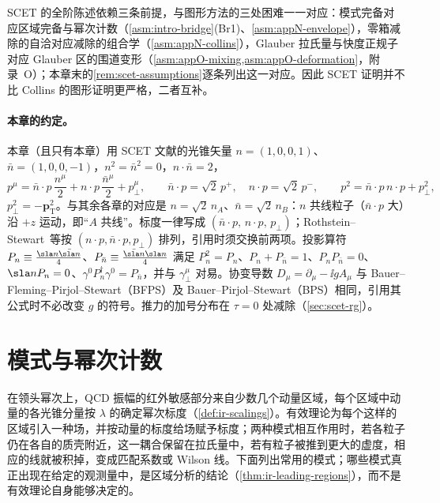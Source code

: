 SCET 的全阶陈述依赖三条前提，与图形方法的三处困难一一对应：模式完备对应区域完备与幂次计数（\cref{asm:intro-bridge}(Br1)、\cref{asm:appN-envelope}），零箱减除的自洽对应减除的组合学（\cref{asm:appN-collins}），Glauber 拉氏量与快度正规子对应 Glauber 区的围道变形（\cref{asm:appO-mixing,asm:appO-deformation}，附录~O）；本章末的\cref{rem:scet-assumptions}逐条列出这一对应。因此 SCET 证明并不比 Collins 的图形证明更严格，二者互补。

\paragraph{本章的约定。}
本章（且只有本章）用 SCET 文献的光锥矢量 $n=(1,0,0,1)$、$\bar n=(1,0,0,-1)$，$n^2=\bar n^2=0$，$n\cdot\bar n=2$，
\begin{equation}\label{eq:scet-decomp}
p^\mu=\bar n\cdot p\,\frac{n^\mu}{2}+n\cdot p\,\frac{\bar n^\mu}{2}+p_\perp^\mu,\qquad
\bar n\cdot p=\sqrt2\,p^+,\quad n\cdot p=\sqrt2\,p^-,\qquad p^2=\bar n\cdot p\,n\cdot p+p_\perp^2 ,
\end{equation}
$p_\perp^2=-\bm p_{\mathrm T}^2$。与其余各章的对应是 $n=\sqrt2\,n_A$、$\bar n=\sqrt2\,n_B$：$n$ 共线粒子（$\bar n\cdot p$ 大）沿 $+z$ 运动，即“$A$ 共线”。标度一律写成 $(\bar n\cdot p,\,n\cdot p,\,p_\perp)$；Rothstein--Stewart~\cite{RothsteinStewart2016}等按 $(n\cdot p,\bar n\cdot p,p_\perp)$ 排列，引用时须交换前两项。投影算符 $P_n\equiv\frac{\sla n\bar{\sla n}}{4}$、$P_{\bar n}\equiv\frac{\bar{\sla n}\sla n}{4}$ 满足 $P_n^2=P_n$、$P_n+P_{\bar n}=1$、$P_nP_{\bar n}=0$、$\sla nP_n=0$、$\gamma^0P_n^\dagger\gamma^0=P_{\bar n}$，并与 $\gamma_\perp^\mu$ 对易。协变导数 $D_\mu=\partial_\mu-\ii gA_\mu$ 与 Bauer--Fleming--Pirjol--Stewart（BFPS）\cite{BauerEtAl2001}及 Bauer--Pirjol--Stewart（BPS）\cite{BauerPirjolStewart2002}相同，引用其公式时不必改变 $g$ 的符号。推力的加号分布在 $\tau=0$ 处减除（\cref{sec:scet-rg}）。

\section{模式与幂次计数}\label{sec:scet-modes}

在领头幂次上，QCD 振幅的红外敏感部分来自少数几个动量区域，每个区域中动量的各光锥分量按 $\lambda$ 的确定幂次标度（\cref{def:ir-scalings}）。有效理论为每个这样的区域引入一种场，并按动量的标度给场赋予标度；两种模式相互作用时，若各粒子仍在各自的质壳附近，这一耦合保留在拉氏量中，若有粒子被推到更大的虚度，相应的线就被积掉，变成匹配系数或 Wilson 线。下面列出常用的模式；哪些模式真正出现在给定的观测量中，是区域分析的结论（\cref{thm:ir-leading-regions}），而不是有效理论自身能够决定的。

